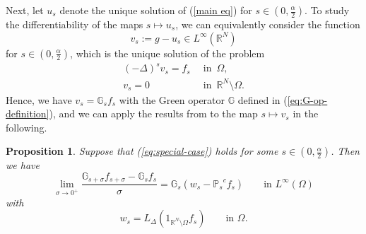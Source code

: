 \documentclass[notitlepage,11pt,reqno]{amsart}
\newtheorem{proposition}[theorem]{Proposition}
\theoremstyle{definition}
\numberwithin{equation}{section}
\newcommand{\cGs}{{\mathbb G}}
\newcommand{\cPs}{{{\mathbb P}_s}}
\newcommand{\R}{\mathds{R}}
\newcommand{\RR}{\mathds{R}}
\begin{document}
Next, let $u_s$ denote the unique solution of (\ref{main eq}) for $s \in (0,\frac{\alpha}{2})$. To study the differentiability of the maps $s \mapsto u_s$, we can equivalently consider the function 
\begin{equation}
\label{v-s-u-s}  
    v_s:=g-u_s \in L^\infty(\R^N)
\end{equation}
for $s \in (0,\frac{\alpha}{2})$, which is the unique solution of the problem 
\begin{align*}
 (-\Delta)^s v_s=f_s\,\,\, &\text{in}\,\,\, \Omega,\\
    v_s=0\,\,\, &\text{in}\,\,\, \RR^N\setminus \Omega.    
\end{align*}
Hence, we have $v_s = \cGs_s f_s$ with the Green operator $\cGs$ defined in (\ref{eq:G-op-definition}), and we can apply the results from \cite{JSW25}
to the map $s \mapsto v_s$ in the following.


\begin{proposition}\label{proof diff}
Suppose that (\ref{eq:special-case}) holds for some $s \in (0,\frac{\alpha}{2})$. Then we have
    \begin{equation}\label{claim}
        \lim_{\sigma \to 0^+} \frac{\cGs_{s+\sigma}f_{s+\sigma}-\cGs_{s} f_s }{\sigma} = \cGs_s (w_s- \cPs^{\! \! c} f_s)\qquad \text{in $L^\infty(\Omega)$}
    \end{equation}
with    
\begin{equation}
  \label{eq:w-s-simple}
w_s = L_{\Delta}(1_{\R^N \setminus \Omega}f_s) \qquad \text{in $\Omega$.}  
\end{equation}
\end{proposition}
\end{document}
